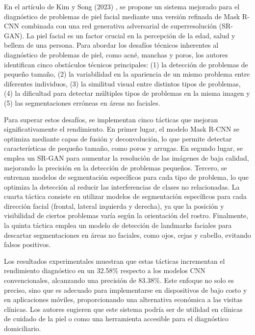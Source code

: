 
En el artículo de Kim y Song (2023) \cite{Kim2023}, se propone un sistema mejorado para el diagnóstico de problemas de piel facial mediante una versión refinada de Mask R-CNN combinada con una red generativa adversarial de superresolución (SR-GAN). La piel facial es un factor crucial en la percepción de la edad, salud y belleza de una persona. Para abordar los desafíos técnicos inherentes al diagnóstico de problemas de piel, como acné, manchas y poros, los autores identifican cinco obstáculos técnicos principales: (1) la detección de problemas de pequeño tamaño, (2) la variabilidad en la apariencia de un mismo problema entre diferentes individuos, (3) la similitud visual entre distintos tipos de problemas, (4) la dificultad para detectar múltiples tipos de problemas en la misma imagen y (5) las segmentaciones erróneas en áreas no faciales.

Para superar estos desafíos, se implementan cinco tácticas que mejoran significativamente el rendimiento. En primer lugar, el modelo Mask R-CNN se optimiza mediante capas de fusión y deconvolución, lo que permite detectar características de pequeño tamaño, como poros y arrugas. En segundo lugar, se emplea un SR-GAN para aumentar la resolución de las imágenes de baja calidad, mejorando la precisión en la detección de problemas pequeños. Tercero, se entrenan modelos de segmentación específicos para cada tipo de problema, lo que optimiza la detección al reducir las interferencias de clases no relacionadas. La cuarta táctica consiste en utilizar modelos de segmentación específicos para cada dirección facial (frontal, lateral izquierda y derecha), ya que la posición y visibilidad de ciertos problemas varía según la orientación del rostro. Finalmente, la quinta táctica emplea un modelo de detección de landmarks faciales para descartar segmentaciones en áreas no faciales, como ojos, cejas y cabello, evitando falsos positivos.

Los resultados experimentales muestran que estas tácticas incrementan el rendimiento diagnóstico en un 32.58\% respecto a los modelos CNN convencionales, alcanzando una precisión de 83.38\%. Este enfoque no solo es preciso, sino que es adecuado para implementarse en dispositivos de bajo costo y en aplicaciones móviles, proporcionando una alternativa económica a las visitas clínicas. Los autores sugieren que este sistema podría ser de utilidad en clínicas de cuidado de la piel o como una herramienta accesible para el diagnóstico domiciliario.

